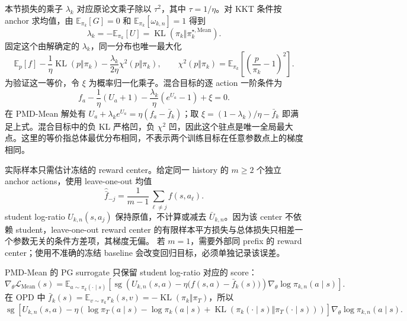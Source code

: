 本节损失的乘子 $\lambda_k$ 对应原论文乘子除以 $\tau^2$，其中 $\tau=1/\eta$。对 KKT 条件按 anchor 求均值，由 $\mathbb E_{\pi_k}[G]=0$ 和 $\mathbb E_{\pi_k}[\omega_{k,n}]=1$ 得到
\[
\lambda_k=-\mathbb E_{\pi_k}[U]
=\operatorname{KL}(\pi_k\Vert\pi_k^{\star,\mathrm{Mean}}).
\]
固定这个由解确定的 $\lambda_k$，同一分布也唯一最大化
\begin{equation}
\mathbb E_p[f]-\frac1\eta\operatorname{KL}(p\Vert\pi_k)
-\frac{\lambda_k}{2\eta}\chi^2(p\Vert\pi_k),
\qquad
\chi^2(p\Vert\pi_k)=\mathbb E_{\pi_k}\left[\left(\frac p{\pi_k}-1\right)^2\right].
\label{eq:ch2-mean-mixed-objective}
\end{equation}
为验证这一等价，令 $\xi$ 为概率归一化乘子。混合目标的逐 action 一阶条件为
\[
f_a-\frac1\eta(U_a+1)-\frac{\lambda_k}{\eta}(e^{U_a}-1)+\xi=0.
\]
在 PMD-Mean 解处有 $U_a+\lambda_k e^{U_a}=\eta(f_a-\bar f_k)$；取
$\xi=(1-\lambda_k)/\eta-\bar f_k$ 即满足上式。混合目标中的负 KL 严格凹，负 $\chi^2$ 凹，因此这个驻点是唯一全局最大点。这里的等价指总体最优分布相同，不表示两个训练目标在任意参数点上的梯度相同。

实际样本只需估计冻结的 reward center。给定同一 history 的 $m\ge2$ 个独立 anchor actions，使用 leave-one-out 均值
\[
\widehat{\bar f}_{-j}=\frac1{m-1}\sum_{\ell\ne j}f(s,a_\ell).
\]
student log-ratio $U_{k,n}(s,a_j)$ 保持原值，不计算或减去 $\bar U_{k,n}$。因为该 center 不依赖 student，leave-one-out reward center 的有限样本平方损失与总体损失只相差一个参数无关的条件方差项，其梯度无偏。
若 $m=1$，需要外部同 prefix 的 reward center；使用不准确的冻结 baseline 会改变回归目标，必须单独记录该误差。

PMD-Mean 的 PG surrogate 只保留 student log-ratio 对应的 score：
\begin{equation}
\label{eq:ch2-mean-pg}
\nabla_\theta\mathcal L_{\mathrm{Mean}}(s)
=\mathbb E_{a\sim\pi_k(\cdot\mid s)}\left[
\operatorname{sg}\!\left(U_{k,n}(s,a)-\eta\bigl(f(s,a)-\bar f_k(s)\bigr)\right)
\nabla_\theta\log\pi_{k,n}(a\mid s)\right].
\end{equation}
在 OPD 中 $\bar f_k(s)=\mathbb E_{v\sim\pi_k}r_k(s,v)=-\operatorname{KL}(\pi_k\Vert\pi_T)$，所以
\begin{equation}
\label{eq:ch2-mean-opd-pg}
\operatorname{sg}\!\left[
U_{k,n}(s,a)-\eta\left(\log\pi_T(a\mid s)-\log\pi_k(a\mid s)
+\operatorname{KL}(\pi_k(\cdot\mid s)\Vert\pi_T(\cdot\mid s))\right)
\right]\nabla_\theta\log\pi_{k,n}(a\mid s).
\end{equation}

